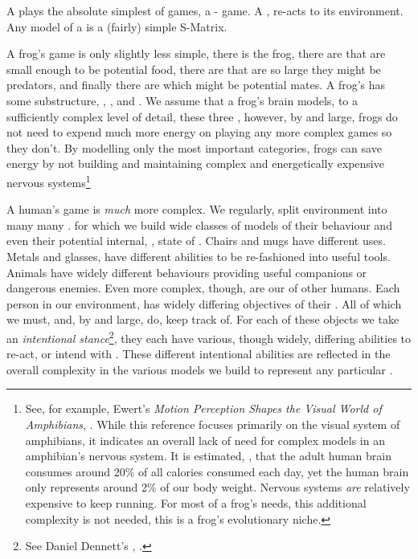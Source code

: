 A  plays the absolute simplest of games, a 
- game. A , re-acts to 
its environment. Any model of a  is a (fairly) simple 
S-Matrix. 

A frog's game is only slightly less simple, there is the frog, there are 
 that are small enough to be potential food, there are 
 that are so large they might be predators, and finally 
there are  which might be potential mates. A frog's 
 has some substructure, , 
, and . We assume that a frog's brain 
models, to a sufficiently complex level of detail, these three 
, however, by and large, frogs do not need to expend much 
more energy on playing any more complex games so they don't. By modelling 
only the most important categories, frogs can save energy by not building 
and maintaining complex and energetically expensive nervous 
systems\footnote{See, for example, Ewert's \emph{Motion Perception Shapes 
the Visual World of Amphibians}, 
\cite{ewert2004motionPerceptionAmphibians}. While this reference focuses 
primarily on the visual system of amphibians, it indicates an overall lack 
of need for complex models in an amphibian's nervous system. It is 
estimated, \cite{raichleGusnard2002brainEnergyBudget}, that the adult 
human brain consumes around 20\% of all calories consumed each day, yet 
the human brain only represents around 2\% of our body weight. Nervous 
systems \emph{are} relatively expensive to keep running. For most of a 
frog's needs, this additional complexity is not needed, this is a frog's 
evolutionary niche.} 

A human's game is \emph{much} more complex. We regularly, split 
 environment into many many .  for 
which we build wide classes of models of their behaviour and even their 
potential internal, , state of . Chairs and 
mugs have different uses. Metals and glasses, have different abilities to 
be re-fashioned into useful tools. Animals have widely different 
behaviours providing useful companions or dangerous enemies. Even more 
complex, though, are our  of other humans. Each person in 
our environment, has widely differing objectives of their . All 
of which we must, and, by and large, do, keep track of. For each of these 
objects we take an \emph{intentional stance}\footnote{See Daniel Dennett's 
, \cite{dennett1987a}.}, they each have 
various, though widely, differing abilities to re-act, or intend with 
. These different intentional abilities are reflected in the 
overall complexity in the various models we build to represent any 
particular . 

